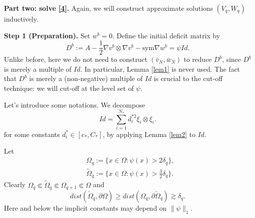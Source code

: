 \documentclass[reqno,12pt]{amsart}
\numberwithin{equation}{section}
\theoremstyle{plain}
\theoremstyle{definition}
\newcommand{\sym}{\text{sym}}
\begin{document}
\textbf{Part two: solve \eqref{4}.} Again, we will construct approximate solutions $(V_q,W_q)$ inductively. 

\textbf{Step 1 (Preparation).}
Set $w^b=0$. Define the initial deficit matrix by 
\begin{equation}\label{z0001}
    D^b:=A-\frac{1}{2}\nabla v^b\otimes\nabla v^b-\sym\nabla w^b=\psi Id.
\end{equation}
Unlike before, here we do not need to construct $(\bar v_N,\bar w_N)$ to reduce $D^b$, since $D^b$ is merely a multiple of $Id$.  In particular, Lemma \ref{lem1} is never used. The fact that $D^b$ is merely a (non-negative) multiple of $Id$ is crucial to the cut-off technique: we will cut-off at the level set of $\psi$.

Let's introduce some notations. We decompose
\begin{equation*}
    Id=\sum_{i=1}^{N_*}d_i^{*2}\xi_i\otimes\xi_i.
\end{equation*}
for some constants $d_i^*\in[c_*,C_*]$, by applying Lemma \ref{lem2} to $Id$. 

Let
\begin{align*}
    &\Omega_q:=\{x\in\Omega:\psi(x)>2\delta_{q}\},\\
    &\tilde\Omega_q:=\{x\in\Omega:\psi(x)>\frac{3}{2}\delta_{q}\}.
\end{align*}
Clearly $\Omega_q\Subset\tilde\Omega_q\Subset\Omega_{q+1}\Subset\Omega$ and
\begin{equation*}
    dist(\tilde\Omega_q,\partial\Omega)\ge dist(\Omega_q,\partial\tilde\Omega_q)\gtrsim \delta_{q}.
\end{equation*}
Here and below the implicit constants may depend on $\|\psi\|_1$.
\end{document}
